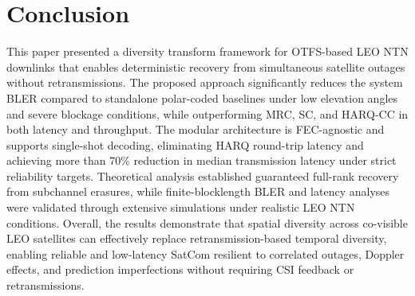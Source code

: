 \documentclass[journal]{IEEEtran}
\begin{document}
\section{Conclusion}
\label{sec:conclusion}
This paper presented a diversity transform framework for OTFS-based LEO NTN downlinks that enables deterministic recovery from simultaneous satellite outages without retransmissions. The proposed approach significantly reduces the system BLER compared to standalone polar-coded baselines under low elevation angles and severe blockage conditions, while outperforming MRC, SC, and HARQ-CC in both latency and throughput. The modular architecture is FEC-agnostic and supports single-shot decoding, eliminating HARQ round-trip latency and achieving more than 70\% reduction in median transmission latency under strict reliability targets. Theoretical analysis established guaranteed full-rank recovery from subchannel erasures, while finite-blocklength BLER and latency analyses were validated through extensive simulations under realistic LEO NTN conditions. Overall, the results demonstrate that spatial diversity across co-visible LEO satellites can effectively replace retransmission-based temporal diversity, enabling reliable and low-latency SatCom resilient to correlated outages, Doppler effects, and prediction imperfections without requiring CSI feedback or retransmissions.
\end{document}
